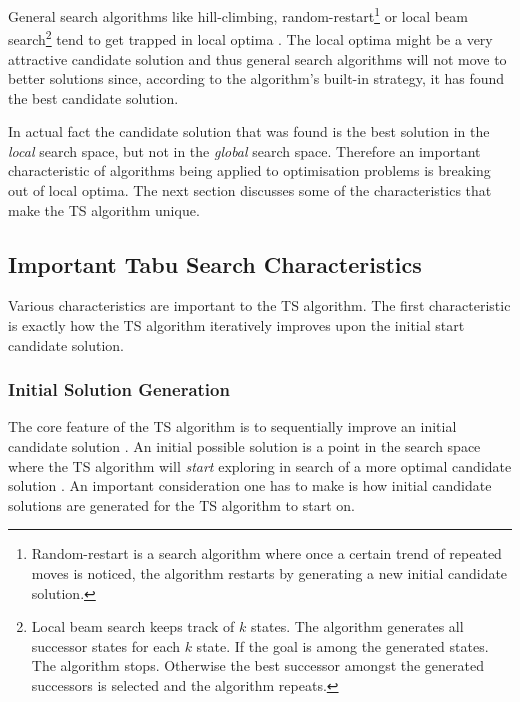 General search algorithms like hill-climbing, random-restart\footnote{Random-restart is a search algorithm where once a certain trend of repeated moves is noticed, the algorithm restarts by generating a new initial candidate solution\cite{AIModernApproach}.} or local beam search\footnote{Local beam search keeps track of $k$ states. The algorithm generates all successor states for each $k$ state. If the goal is among the generated states. The algorithm stops. Otherwise the best successor amongst the generated successors is selected and the algorithm repeats\cite{AIModernApproach}.} tend to get trapped in local optima \cite{AIModernApproach}. The local optima might be a very attractive candidate solution and thus general search algorithms will not move to better solutions since, according to the algorithm's built-in strategy, it has found the best candidate solution. 

In actual fact the candidate solution that was found is the best solution in the \emph{local} search space, but not in the \emph{global} search space\cite{CompuIntelligenceIntro,AIModernApproach}. Therefore an important characteristic of algorithms being applied to optimisation problems is breaking out of local optima\cite{CompuIntelligenceIntro,AIModernApproach}.
The next section discusses some of the characteristics that make the \gls{TS} algorithm unique.

\subsection{Important Tabu Search Characteristics}
\label{sec:TScharacteristics}
Various characteristics are important to the \gls{TS} algorithm. The first characteristic is exactly how the \gls{TS} algorithm iteratively improves upon the initial start candidate solution.

\subsubsection{Initial Solution Generation}
The core feature of the \gls{TS} algorithm is to sequentially improve an initial candidate solution \cite{TSHazardous}. An initial possible solution is a point in the search space where the \gls{TS} algorithm will \emph{start} exploring in search of a more optimal candidate solution \cite{AIModernApproach,TSHazardous}.
An important consideration one has to make is how initial candidate solutions are generated for the \gls{TS} algorithm to start on\cite{AIModernApproach,TSHazardous}.

